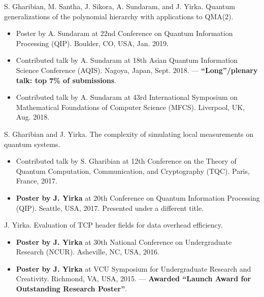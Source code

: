 \documentclass[11pt,letterpaper,serif]{moderncv}
\begin{document}
S. Gharibian, M. Santha, J. Sikora, A. Sundaram, and J. Yirka. Quantum generalizations of the polynomial hierarchy with applications to QMA(2).
\begin{adjustwidth}{.25in}{} 
	\begin{itemize}
		\item Poster by A. Sundaram at 22nd Conference on Quantum Information Processing (QIP). Boulder, CO, USA, Jan. 2019.
		\item Contributed talk by A. Sundaram at 18th Asian Quantum Information Science Conference (AQIS). Nagoya, Japan, Sept. 2018. --- \textbf{``Long''/plenary talk: top 7\% of submissions}.
		\item Contributed talk by A. Sundaram at 43rd International	Symposium on Mathematical Foundations of Computer Science (MFCS). Liverpool, UK, Aug. 2018.
	\end{itemize}
\end{adjustwidth}

S. Gharibian and J. Yirka. The complexity of simulating local measurements on quantum systems.
\begin{adjustwidth}{.25in}{}
	\begin{itemize}
		\item Contributed talk by S. Gharibian at 12th Conference on the Theory of Quantum Computation, Communication,
		and Cryptography (TQC). Paris, France, 2017.
		\item \textbf{Poster by J. Yirka} at 20th Conference on Quantum Information Processing (QIP). Seattle, USA, 2017. Presented under a different title.
	\end{itemize}
\end{adjustwidth}

J. Yirka. Evaluation of TCP header fields for data overhead efficiency.
\begin{adjustwidth}{.25in}{}
	\begin{itemize}
		\item \textbf{Poster by J. Yirka} at 30th National Conference on Undergraduate Research (NCUR). Asheville, NC, USA, 2016.
		\item \textbf{Poster by J. Yirka} at VCU Symposium for Undergraduate Research and Creativity. Richmond, VA, USA, 2015. --- \textbf{Awarded ``Launch Award for Outstanding Research Poster''}.	
	\end{itemize}
\end{adjustwidth}


\end{document}
